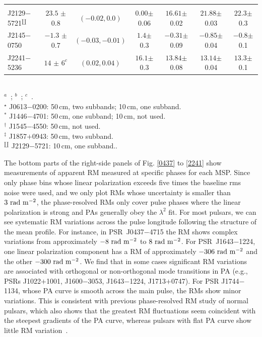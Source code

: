 \documentclass[useAMS,usenatbib]{mn2e}
\begin{document}
\begin{table}
\begin{tabular}{lcccccc}
                        &                         &                    &                      &                       &                        &                        \\
J2129$-$5721$^\amalg$   & $23.5  $ $\pm$ 0.8      &  $(-0.02, 0.0)   $ &$0.00   $$\pm$ 0.06  & $16.61   $$\pm$ 0.02  &  $21.88   $$\pm$ 0.03  &  $22.3   $$\pm$ 0.3     \\  
J2145$-$0750            & $-1.3  $ $\pm$ 0.7      &  $(-0.03, -0.01) $ & $1.4    $$\pm$ 0.3   & $-0.31   $$\pm$ 0.09  &  $-0.85   $$\pm$ 0.04  &  $-0.8   $$\pm$ 0.1     \\  
J2241$-$5236            & $14    $ $\pm$ $6^c$    &  $(0.02, 0.04)   $ & $16.1   $$\pm$ 0.3   & $13.84   $$\pm$ 0.08  &  $13.14   $$\pm$ 0.04  &  $13.3   $$\pm$ 0.1    \\
\hline
\end{tabular}
~\\
$^a$~\citet{Keith12}; $^b$~\citet{Burgay13}; $^c$~\citet{Keith11}.
~\\
$^\star$ J0613$-$0200: 50\,cm, two subbands; 10\,cm, one subband. 
~\\
$^\ast$ J1446$-$4701: 50\,cm, one subband; 10\,cm, not used. 
~\\
$^\dagger$ J1545$-$4550: 50\,cm, not used. 
~\\
$^\ddagger$ J1857$+$0943: 50\,cm, two subband. 
~\\
$^\amalg$ J2129$-$5721: 10\,cm, one subband..
\end{table}
 

The bottom parts of the right-side panels of Fig. \ref{0437} to \ref{2241} show measurements of 
apparent RM measured at specific phases for each MSP.
%
Since only phase bins whose linear polarization exceeds five times the baseline 
rms noise were used, and we only plot RMs whose uncertainty is smaller than $3\ \rm{rad\ m^{-2}}$,
the phase-resolved RMs only cover pulse phases where the linear polarization is 
strong and PAs generally obey the $\lambda^2$ fit.
%
For most pulsars, we can see systematic RM variations across the pulse longitude following the 
structure of the mean profile.
%
For instance, in PSR~J0437$-$4715 the RM shows complex variations from approximately $-8\ \rm{rad\ m^{-2}}$ 
to $8\ \rm{rad\ m^{-2}}$. For PSR~J1643$-$1224, one linear polarization component has 
a RM of approximately $-306\ \rm{rad\ m^{-2}}$ and the other $-300\ \rm{rad\ m^{-2}}$. 
%
We find that in some cases significant RM variations are associated with orthogonal or non-orthogonal 
mode transitions in PA (e.g., PSRs J1022$+$1001, J1600$-$3053, J1643$-$1224, J1713$+$0747).
%
For PSR J1744$-$1134, whose PA curve is smooth across the main pulse, the RMs show minor 
variations.
%
This is consistent with previous phase-resolved RM study of normal pulsars, which also shows 
that the greatest RM fluctuations seem coincident with the steepest gradients of the PA 
curve, whereas pulsars with flat PA curve show little RM variation~\citep{Noutsos09}.
\end{document}
